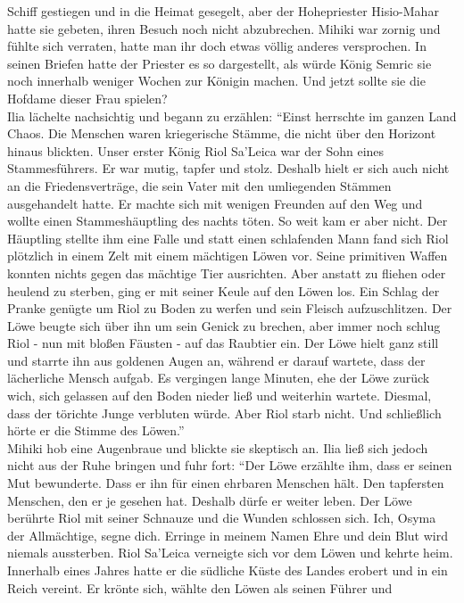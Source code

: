 Schiff gestiegen und in die Heimat gesegelt, aber der Hohepriester Hisio-Mahar hatte sie gebeten, 
ihren Besuch noch nicht abzubrechen. Mihiki war zornig und fühlte sich verraten, hatte man ihr doch 
etwas völlig anderes versprochen. In seinen Briefen hatte der Priester es so dargestellt, als würde 
König Semric sie noch innerhalb weniger Wochen zur Königin machen. Und jetzt sollte sie die Hofdame 
dieser Frau spielen?\\
Ilia lächelte nachsichtig und begann zu erzählen: ``Einst herrschte im ganzen Land Chaos. Die 
Menschen waren kriegerische Stämme, die nicht über den Horizont hinaus blickten. Unser erster König 
Riol Sa'Leica war der Sohn eines Stammesführers. Er war mutig, tapfer und stolz. Deshalb hielt er 
sich auch nicht an die Friedensverträge, die sein Vater mit den umliegenden Stämmen ausgehandelt 
hatte. Er machte sich mit wenigen Freunden auf den Weg und wollte einen Stammeshäuptling des nachts 
töten. So weit kam er aber nicht. Der Häuptling stellte ihm eine Falle und statt einen schlafenden 
Mann fand sich Riol plötzlich in einem Zelt mit einem mächtigen Löwen vor. Seine primitiven Waffen 
konnten nichts gegen das mächtige Tier ausrichten. Aber anstatt zu fliehen oder heulend zu sterben, 
ging er mit seiner Keule auf den Löwen los. Ein Schlag der Pranke genügte um Riol zu Boden zu 
werfen und sein Fleisch aufzuschlitzen. Der Löwe beugte sich über ihn um sein Genick zu brechen, 
aber immer noch schlug Riol - nun mit bloßen Fäusten - auf das Raubtier ein. Der Löwe hielt ganz 
still und starrte ihn aus goldenen Augen an, während er darauf wartete, dass der lächerliche Mensch 
aufgab. Es vergingen lange Minuten, ehe der Löwe zurück wich, sich gelassen auf den Boden nieder 
ließ und weiterhin wartete. Diesmal, dass der törichte Junge verbluten würde. Aber Riol starb nicht. Und schließlich hörte er die Stimme des Löwen.''\\
Mihiki hob eine Augenbraue und blickte sie skeptisch an. Ilia ließ sich jedoch nicht aus der Ruhe 
bringen und fuhr fort: ``Der Löwe erzählte ihm, dass er seinen Mut bewunderte. Dass er ihn für 
einen ehrbaren Menschen hält. Den tapfersten Menschen, den er je gesehen hat. Deshalb dürfe er weiter leben. Der 
Löwe berührte Riol mit seiner Schnauze und die Wunden schlossen sich. Ich, Osyma der Allmächtige, 
segne dich. Erringe in meinem Namen Ehre und dein Blut wird niemals aussterben. Riol Sa'Leica 
verneigte sich vor dem Löwen und kehrte heim. Innerhalb eines Jahres hatte er die südliche Küste 
des Landes erobert und in ein Reich vereint. Er krönte sich, wählte den Löwen als seinen Führer und 

